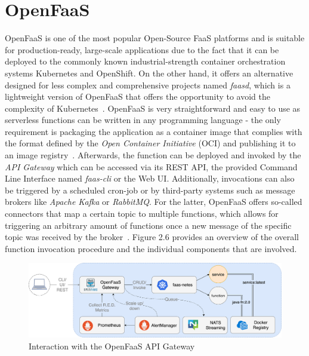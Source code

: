 \section{OpenFaaS}
OpenFaaS is one of the most popular Open-Source FaaS platforms and is suitable for production-ready, large-scale applications due to the fact that it can be deployed to the commonly known industrial-strength container orchestration systems Kubernetes and OpenShift. On the other hand, it offers an alternative designed for less complex and comprehensive projects named \textit{faasd}, which is a lightweight version of OpenFaaS that offers the opportunity to avoid the complexity of Kubernetes~\parencite{openfaas-deployment}. OpenFaaS is very straightforward and easy to use as serverless functions can be written in any programming language - the only requirement is packaging the application as a container image that complies with the format defined by the \textit{Open Container Initiative} (OCI) and publishing it to an image registry~\parencite{openfaas-intro}. Afterwards, the function can be deployed and invoked by the \textit{API Gateway} which can be accessed via its REST API, the provided Command Line Interface named \textit{faas-cli} or the Web UI. Additionally, invocations can also be triggered by a scheduled cron-job or by third-party systems such as message brokers like \textit{Apache Kafka} or \textit{RabbitMQ}. For the latter, OpenFaaS offers so-called connectors that map a certain topic to multiple functions, which allows for triggering an arbitrary amount of functions once a new message of the specific topic was received by the broker~\parencite{openfaas-triggers}. Figure 2.6 provides an overview of the overall function invocation procedure and the individual components that are involved.

\begin{figure}[h]
    \centering
    \includegraphics[width=1\textwidth]{./figures/of-workflow.png}
    \caption{Interaction with the OpenFaaS API Gateway~\parencite{openfaas-stack}}
    \label{fig:openfaas-gateway}
\end{figure}

